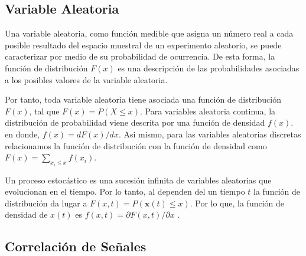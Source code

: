 \subsection{Variable Aleatoria}\label{subs:varaleatoria}

Una variable aleatoria, como función medible que asigna un número real a cada posible resultado del espacio muestral de un experimento aleatorio, se puede caracterizar por medio de su probabilidad de ocurrencia. De esta forma, la función de distribución ${F(x)}$  es una descripción de las probabilidades asociadas a los posibles valores de la variable aleatoria.

Por tanto, toda variable aleatoria tiene asociada una función de distribución ${F(x)}$, tal que ${F(x)=P(X \leq x)}$. Para variables aleatoria continua, la distribución de probabilidad viene descrita por una función de densidad
${f(x)}$. en donde, ${f(x)= dF(x)/dx}$. Asi mismo,  para las variables aleatorias discretas relacionamos la función de distribución con la función de densidad como ${F(x)= \displaystyle\sum_{x_i \leq x }f(x_i)}$.

Un proceso estocástico es una sucesión infinita de variables aleatorias que evolucionan en el tiempo. Por lo tanto, al dependen del un tiempo $t$  la función de distribución da lugar a ${F(x,t)=P(\mathbf{x}(t) \leq x)}$.
Por lo que, la función de densidad de $x(t)$ es $f(x,t)= \partial{F(x,t)}/\partial{x}$ \cite{Papoulis91}.

\subsection{Correlación de Señales}\label{subs:corresignal}

%
%
%
%

